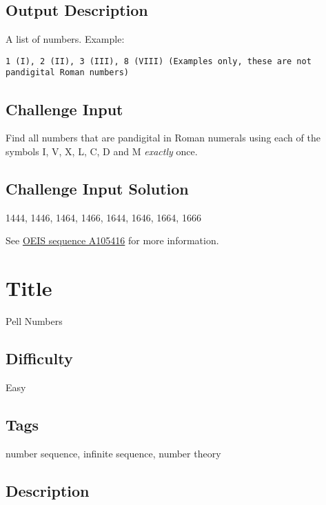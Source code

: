 \subsection{Output Description}\label{output-description-25}

A list of numbers. Example:

\begin{verbatim}
1 (I), 2 (II), 3 (III), 8 (VIII) (Examples only, these are not pandigital Roman numbers)
\end{verbatim}

\subsection{Challenge Input}\label{challenge-input-27}

Find all numbers that are pandigital in Roman numerals using each of the
symbols I, V, X, L, C, D and M \emph{exactly} once.

\subsection{Challenge Input Solution}\label{challenge-input-solution-2}

1444, 1446, 1464, 1466, 1644, 1646, 1664, 1666

See \href{http://oeis.org/A105416}{OEIS sequence A105416} for more
information.

\section{Title}\label{title-34}

Pell Numbers

\subsection{Difficulty}\label{difficulty-33}

Easy

\subsection{Tags}\label{tags-34}

number sequence, infinite sequence, number theory

\subsection{Description}\label{description-34}

